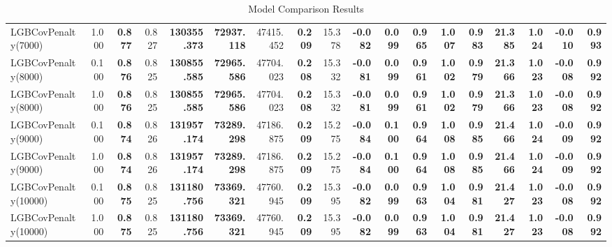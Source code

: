 \documentclass[11pt]{article}
\theoremstyle{plain}
\theoremstyle{definition}
\newcommand{\1}{\mathbf{1}}
\begin{document}
\begin{table}[htbp]
{\begin{tabular}{lrrrrrrrrrrrrrrrrr}
LGBCovPenalty(7000) & 1.000 & \textbf{0.877} & 0.827 & \textbf{130355.373} & \textbf{72937.118} & 47415.452 & \textbf{0.209} & 15.378 & \textbf{-0.082} & \textbf{0.099} & \textbf{0.965} & \textbf{1.007} & \textbf{0.983} & \textbf{21.385} & \textbf{1.024} & \textbf{-0.010} & \textbf{0.993} \\
LGBCovPenalty(8000) & 0.100 & \textbf{0.876} & 0.825 & \textbf{130855.585} & \textbf{72965.586} & 47704.023 & \textbf{0.208} & 15.332 & \textbf{-0.081} & \textbf{0.099} & \textbf{0.961} & \textbf{1.002} & \textbf{0.979} & \textbf{21.366} & \textbf{1.023} & \textbf{-0.008} & \textbf{0.992} \\
LGBCovPenalty(8000) & 1.000 & \textbf{0.876} & 0.825 & \textbf{130855.585} & \textbf{72965.586} & 47704.023 & \textbf{0.208} & 15.332 & \textbf{-0.081} & \textbf{0.099} & \textbf{0.961} & \textbf{1.002} & \textbf{0.979} & \textbf{21.366} & \textbf{1.023} & \textbf{-0.008} & \textbf{0.992} \\
LGBCovPenalty(9000) & 0.100 & \textbf{0.874} & 0.826 & \textbf{131957.174} & \textbf{73289.298} & 47186.875 & \textbf{0.209} & 15.275 & \textbf{-0.084} & \textbf{0.100} & \textbf{0.964} & \textbf{1.008} & \textbf{0.985} & \textbf{21.466} & \textbf{1.024} & \textbf{-0.009} & \textbf{0.992} \\
LGBCovPenalty(9000) & 1.000 & \textbf{0.874} & 0.826 & \textbf{131957.174} & \textbf{73289.298} & 47186.875 & \textbf{0.209} & 15.275 & \textbf{-0.084} & \textbf{0.100} & \textbf{0.964} & \textbf{1.008} & \textbf{0.985} & \textbf{21.466} & \textbf{1.024} & \textbf{-0.009} & \textbf{0.992} \\
LGBCovPenalty(10000) & 0.100 & \textbf{0.875} & 0.825 & \textbf{131180.756} & \textbf{73369.321} & 47760.945 & \textbf{0.209} & 15.395 & \textbf{-0.082} & \textbf{0.099} & \textbf{0.963} & \textbf{1.004} & \textbf{0.981} & \textbf{21.427} & \textbf{1.023} & \textbf{-0.008} & \textbf{0.992} \\
LGBCovPenalty(10000) & 1.000 & \textbf{0.875} & 0.825 & \textbf{131180.756} & \textbf{73369.321} & 47760.945 & \textbf{0.209} & 15.395 & \textbf{-0.082} & \textbf{0.099} & \textbf{0.963} & \textbf{1.004} & \textbf{0.981} & \textbf{21.427} & \textbf{1.023} & \textbf{-0.008} & \textbf{0.992} \\
\bottomrule
\end{tabular}
     }
    \caption{Model Comparison Results}
    \label{tab:model_comparison}
\end{table}
\end{document}
